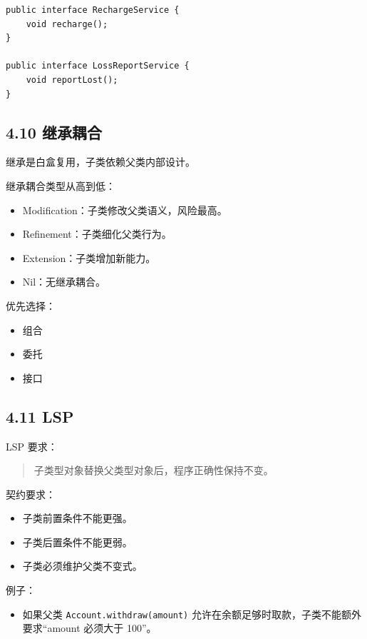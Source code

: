\documentclass[UTF8,zihao=-4]{ctexart}
\begin{document}
\small
\begin{verbatim}
public interface RechargeService {
    void recharge();
}

public interface LossReportService {
    void reportLost();
}
\end{verbatim}
\normalsize

\subsection{4.10 继承耦合}

继承是白盒复用，子类依赖父类内部设计。

继承耦合类型从高到低：

\begin{itemize}
\item Modification：子类修改父类语义，风险最高。
\item Refinement：子类细化父类行为。
\item Extension：子类增加新能力。
\item Nil：无继承耦合。
\end{itemize}

优先选择：

\begin{itemize}
\item 组合
\item 委托
\item 接口
\end{itemize}

\subsection{4.11 LSP}

LSP 要求：

\begin{quote}
子类型对象替换父类型对象后，程序正确性保持不变。
\end{quote}

契约要求：

\begin{itemize}
\item 子类前置条件不能更强。
\item 子类后置条件不能更弱。
\item 子类必须维护父类不变式。
\end{itemize}

例子：

\begin{itemize}
\item 如果父类 \texttt{Account.withdraw(amount)} 允许在余额足够时取款，子类不能额外要求“amount 必须大于 100”。
\end{itemize}
\end{document}
